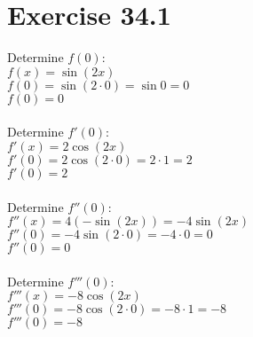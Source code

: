 \documentclass[a4paper, 10pt]{scrartcl}
\begin{document}
\section{Exercise 34.1}

Determine $f(0)$:\\
$f(x) = \sin{(2x)}$\\
$f(0) = \sin{(2 \cdot 0)} = \sin{0} = 0$\\
$f(0) = 0$\\
\\
Determine $f'(0)$:\\
$f'(x) = 2 \cos{(2x)}$\\
$f'(0) = 2 \cos{(2 \cdot 0)} = 2 \cdot 1 = 2$\\
$f'(0) = 2$\\
\\
Determine $f''(0)$:\\
$f''(x) = 4 (- \sin{(2x)}) = -4 \sin{(2x)}$\\
$f''(0) = -4 \sin{(2 \cdot 0)} = -4 \cdot 0 = 0$\\
$f''(0) = 0$\\
\\
Determine $f'''(0)$:\\
$f'''(x) = -8 \cos{(2x)}$\\
$f'''(0) = -8 \cos{(2 \cdot 0)} = -8 \cdot 1 = -8$\\
$f'''(0) = -8$\\
\end{document}
